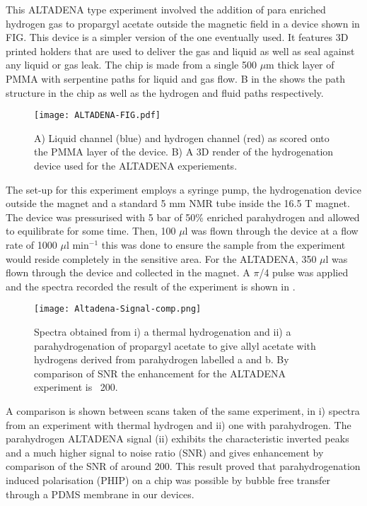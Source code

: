 This ALTADENA type experiment involved the addition of para enriched hydrogen
gas to propargyl acetate outside the magnetic field in a device shown in FIG. This device
is a simpler version of the one eventually used.
It features 3D printed holders that are used to deliver the gas and liquid as
well as seal against any liquid or gas leak. The chip is made from a single 500
$\mu$m thick layer of PMMA with serpentine paths for liquid and gas flow. B in the
 shows the path structure in the chip as well as the hydrogen and fluid paths
respectively.

\begin{figure}
  \begin{center}
  \texttt{[image: ALTADENA-FIG.pdf]}
  \end{center}
  \caption{A) Liquid channel (blue) and hydrogen channel (red) as scored
  onto the PMMA layer of the device. B) A 3D render of the hydrogenation device
  used for the ALTADENA experiements.}
  \label{fig:AltadenaChip}
\end{figure}

The set-up for this experiment employs a syringe pump, the hydrogenation device
outside the magnet and a standard 5 mm NMR tube inside the 16.5 T magnet. The device
was pressurised with 5 bar of 50\% enriched parahydrogen and allowed to equilibrate
for some time. Then, 100 $\mu$l was flown through the device at a flow rate of 1000
$\mu$l min$^{-1}$ this was done to ensure the sample from the experiment would reside
completely in the sensitive area. For the ALTADENA, 350 $\mu$l was flown through
the device and collected in the magnet. A $\pi$/4 pulse was applied and the spectra
recorded the result of the experiment is shown in .

\begin{figure}
  \begin{center}
  \texttt{[image: Altadena-Signal-comp.png]}
  \end{center}
  \caption{Spectra obtained from i) a thermal hydrogenation and ii) a parahydrogenation
  of propargyl acetate to give allyl acetate with hydrogens derived from parahydrogen labelled a and
  b. By comparison of SNR the enhancement for the ALTADENA experiment is ~200. }
  \label{fig:AltadenaResults}
\end{figure}

A comparison is shown between scans taken of the same experiment, in  i) spectra
from an experiment with thermal hydrogen and ii) one with parahydrogen. The parahydrogen
ALTADENA signal (ii) exhibits the characteristic inverted peaks and a much higher signal
to noise ratio (SNR) and gives enhancement by comparison of the SNR of around 200.
This result proved that parahydrogenation induced polarisation (PHIP) on a chip
was possible by bubble free transfer through a PDMS membrane in our devices.

